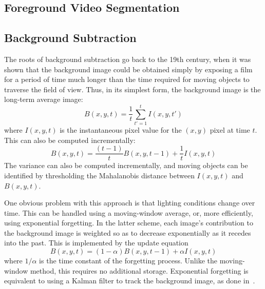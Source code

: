 






\subsection{Foreground Video Segmentation}
\label{sec:formal-problem}



\subsection{Background Subtraction}
\label{background-subtraction-section}

The roots of background subtraction go back to the 19th century, when
it was shown that the background image could be obtained simply by
exposing a film for a period of time much longer than the time
required for moving objects to traverse the field of view. Thus, in
its simplest form, the background image is the long-term average
image:
\[ B(x,y,t) = \frac{1}{t}\sum_{t'=1}^t I(x,y,t') \]
where $I(x,y,t)$ is the instantaneous pixel value for the $(x,y)$
pixel at time $t$. This can also be computed incrementally:
\[B(x,y,t) = \frac{(t-1)}{t}B(x,y,t-1) + \frac{1}{t}I(x,y,t)\]
The variance can also be computed incrementally, and moving
objects can be identified by thresholding the Mahalanobis distance
between $I(x,y,t)$ and $B(x,y,t)$.

One obvious problem with this approach is that lighting conditions
change over time. This can be handled using a moving-window average,
or, more efficiently, using exponential forgetting. In the latter
scheme, each image's contribution to the background image is weighted
so as to decrease exponentially as it recedes into the past. This is
implemented by the update equation
\begin{equation}
B(x,y,t) = (1-\alpha)B(x,y,t-1) + \alpha I(x,y,t)
\label{forgetting-equation}
\end{equation}
where $1/\alpha$ is the time constant of the forgetting process.
Unlike the moving-window method, this requires no additional storage.
Exponential forgetting is equivalent to using a Kalman filter to track
the background image, as done in~\cite{Koller+al:1994}.




